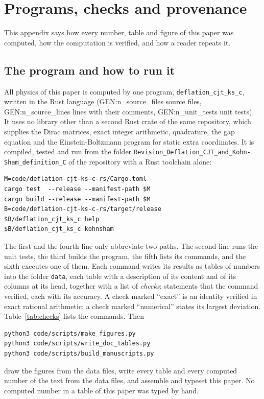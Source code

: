 \section{Programs, checks and provenance}
\label{app:checks}

This appendix says how every number, table and figure of this paper was computed, how the
computation is verified, and how a reader repeats it.

\subsection{The program and how to run it}

All physics of this paper is computed by one program, \texttt{deflation\_cjt\_ks\_c}, written in the
Rust language ({{GEN:n_source_files}} source files, {{GEN:n_source_lines}} lines with their
comments, {{GEN:n_unit_tests}} unit tests). It uses no library other than a second Rust crate of the
same repository, which supplies the Dirac matrices, exact integer arithmetic, quadrature, the gap
equation and the Einstein-Boltzmann program for static extra coordinates. It is compiled, tested and
run from the folder \texttt{Revision\_Deflation\_CJT\_\allowbreak and\_Kohn-Sham\_\allowbreak definition\_C} of the repository
\cite{DeflationRepo} with a Rust toolchain alone:
{\footnotesize
\begin{verbatim}
M=code/deflation-cjt-ks-c-rs/Cargo.toml
cargo test  --release --manifest-path $M
cargo build --release --manifest-path $M
B=code/deflation-cjt-ks-c-rs/target/release
$B/deflation_cjt_ks_c help
$B/deflation_cjt_ks_c kohnsham
\end{verbatim}
}
\noindent The first and the fourth line only abbreviate two paths. The second line runs the unit
tests, the third builds the program, the fifth lists its commands, and the sixth executes one of
them. Each command writes its results as tables of numbers into the
folder \texttt{data}, each table with a description of its content and of its columns at its head,
together with a list of \emph{checks}: statements that the command verified, each with its
accuracy. A check marked ``exact'' is an identity verified in exact rational arithmetic; a check
marked ``numerical'' states its largest deviation. Table~\ref{tab:checks} lists the commands. Then
{\footnotesize
\begin{verbatim}
python3 code/scripts/make_figures.py
python3 code/scripts/write_doc_tables.py
python3 code/scripts/build_manuscripts.py
\end{verbatim}
}
\noindent draw the figures from the data files, write every table and every computed number of the text from
the data files, and assemble and typeset this paper. No computed number in a table of this paper was
typed by hand.

